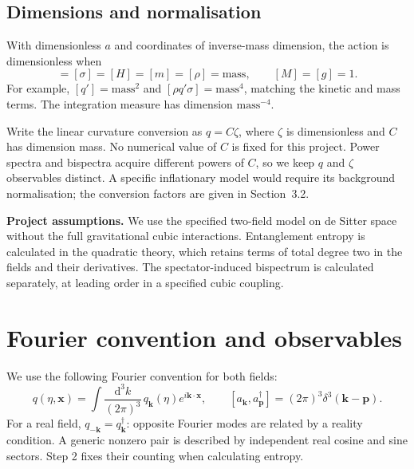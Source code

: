 \documentclass[11pt,a4paper]{article}
\newcommand{\dd}{\mathrm{d}}
\begin{document}
\subsection{Dimensions and normalisation}
With dimensionless $a$ and coordinates of inverse-mass dimension, the action is dimensionless when
\begin{equation}
[q]=[\sigma]=[H]=[m]=[\rho]=\text{mass},\qquad [M]=[g]=1.
\end{equation}
For example, $[q']=\text{mass}^2$ and $[\rho q'\sigma]=\text{mass}^4$, matching the kinetic and mass terms. The integration measure has dimension $\text{mass}^{-4}$.

Write the linear curvature conversion as $q=C\zeta$, where $\zeta$ is dimensionless and $C$ has dimension mass. No numerical value of $C$ is fixed for this project. Power spectra and bispectra acquire different powers of $C$, so we keep $q$ and $\zeta$ observables distinct. A specific inflationary model would require its background normalisation; the conversion factors are given in Section~3.2.

\begin{tcolorbox}
\textbf{Project assumptions.} We use the specified two-field model on de Sitter space without the full gravitational cubic interactions. Entanglement entropy is calculated in the quadratic theory, which retains terms of total degree two in the fields and their derivatives. The spectator-induced bispectrum is calculated separately, at leading order in a specified cubic coupling.
\end{tcolorbox}

\newpage
\section{Fourier convention and observables}
We use the following Fourier convention for both fields:
\begin{equation}
q(\eta,\bm{x})=\int\frac{\dd^3k}{(2\pi)^3}\,q_{\bm{k}}(\eta)e^{i\bm{k}\cdot\bm{x}},
\qquad [a_{\bm{k}},a^\dagger_{\bm{p}}]=(2\pi)^3\delta^3(\bm{k}-\bm{p}).
\label{eq:fourier}
\end{equation}
For a real field, $q_{-\bm{k}}=q_{\bm{k}}^\dagger$: opposite Fourier modes are related by a reality condition. A generic nonzero pair is described by independent real cosine and sine sectors. Step 2 fixes their counting when calculating entropy.
\end{document}

